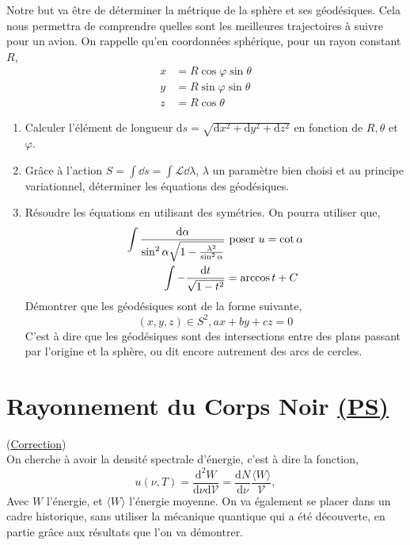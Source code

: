 \documentclass[a4paper,10pt]{report}
\begin{document}
	Notre but va être de déterminer la métrique de la sphère et ses géodésiques. Cela nous permettra de comprendre quelles sont les meilleures trajectoires à suivre pour un avion.
	On rappelle qu'en coordonnées sphérique, pour un rayon constant $R$,
	\begin{align*}
		x &= R\cos \varphi \sin \theta \\
		y &= R\sin \varphi \sin \theta \\
		z &= R\cos \theta 
		\end{align*}
	\begin{enumerate}
		\item Calculer l'élément de longueur $\text{d}s = \sqrt{\text{d}x^2+\text{d}y^2+\text{d}z^2}$ en fonction de $R, \theta$ et $\varphi$.
		\item Grâce à l'action $S = \int \dd s = \int \mathcal L \dd\lambda$, $\lambda$ un paramètre bien choisi et au principe variationnel, déterminer les équations des géodésiques. 
		\item 
		Résoudre les équations en utilisant des symétries.
		On pourra utiliser que,
		\begin{align*}
			\int \frac{\dd \alpha}{\sin^2 \alpha \sqrt{1-\frac {\lambda^2} {\sin^2 \alpha}}} &\text{ poser } u = \cot \alpha \\
			\int -\frac {\text dt}{\sqrt{1-t^2}} &= \arccos t + C
		\end{align*}
	Démontrer que les géodésiques sont de la forme suivante,
		$$(x, y, z) \in S^2, a x + b y + c z = 0$$
		C'est à dire que les géodésiques sont des intersections entre des plans passant par l'origine et la sphère, ou dit encore autrement des arcs de cercles.
	\end{enumerate}

	\newpage \section[Rayonnement du Corps Noir]{Rayonnement du Corps Noir \hyperref[subsubsec:statistique]{(PS)}\space \faStar\faStar\faStar\faStar}\label{subsec:CorpsNoir}
	(\hyperref[subsec:correctionCorpsNoir]{Correction})
\\
	On cherche à avoir la densité spectrale d'énergie, c'est à dire la fonction,
	\begin{equation*}
u(\nu, T) = \frac {\text{d}^2W} {\text{d}\nu\text{d}\mathcal{V}} = \frac {\text{d}N} {\text{d}\nu}\frac{\langle W \rangle}{\mathcal{V}}, \tag{2.6.1} \label{eq:3.6.1}
	\end{equation*}
	Avec $W$ l'énergie, et $\langle W \rangle$ l'énergie moyenne.
	On va également se placer dans un cadre historique, sans utiliser la mécanique quantique qui a été découverte, en partie grâce aux résultats que l'on va démontrer.
\end{document}
